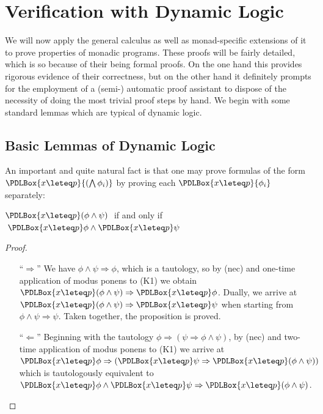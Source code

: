 
\chapter{Verification with Dynamic Logic}
\label{cha:application}

We will now apply the general calculus as well as monad-specific extensions of
it to prove properties of monadic programs. These proofs will be fairly
detailed, which is so because of their being formal proofs. On the one hand this
provides rigorous evidence of their correctness, but on the other hand it 
definitely prompts for the employment of a \mbox{(semi-)} automatic proof assistant to
dispose of the necessity of doing the most trivial proof steps by hand. We begin
with some standard lemmas which are typical of dynamic logic.


\section{Basic Lemmas of Dynamic Logic}
\label{sec:basic-lemmas}

An important and quite natural fact is that one may prove formulas of the form
$\PDLBox{x\leteq p}{(\bigwedge\phi_i)}$ by proving each $\PDLBox{x\leteq p}{\phi_i}$ separately:
\begin{lem}
\label{thm:box-and-distrib}
 $\PDLBox{x\leteq p}(\phi \land \psi)\;$ if and only if $\;\PDLBox{x\leteq p}\phi \land
 \PDLBox{x\leteq p} \psi$
\end{lem}

\begin{proof}
\begin{itemize}
\item[``$\Rightarrow$''] We have $\phi \land \psi \Rightarrow \phi$, which is a tautology, so by (nec) and
  one-time application of modus ponens to (K1) we obtain $\PDLBox{x\leteq p}(\phi \land
  \psi) \Rightarrow \PDLBox{x\leteq p}\phi$.  Dually, we arrive at $\PDLBox{x\leteq p}(\phi \land \psi) \Rightarrow
  \PDLBox{x\leteq p}\psi$ when starting from $\phi \land \psi \Rightarrow \psi$. Taken together, the
  proposition is proved.

\item[``$\Leftarrow$''] Beginning with the tautology $\phi \Rightarrow (\psi \Rightarrow \phi \land \psi)$, by (nec) and
  two-time application of modus ponens to (K1) we arrive at $\PDLBox{x\leteq p}\phi
  \Rightarrow (\PDLBox{x\leteq p}\psi \Rightarrow \PDLBox{x\leteq p}(\phi \land \psi))$ which is tautologously
  equivalent to $\PDLBox{x\leteq p} \phi \land \PDLBox{x\leteq p} \psi \Rightarrow \PDLBox{x\leteq
    p}(\phi \land \psi)$.
\end{itemize}
\end{proof}

